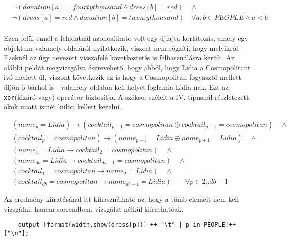 \documentclass[12pt,a4paper,twoside, openright]{report}
\begin{document}
    \begin{equation} \label{eq:16}
    \begin{aligned}
    	&\neg(donation[a]=fourtythousand \wedge dress[b]=red) \quad \wedge \\
    	&\neg(dress[a]=red \wedge donation[b]=twentythousand) \quad \forall a,b \in PEOPLE \wedge a<b \\
    \end{aligned}
    \end{equation}

    Ezen felül ennél a feladatnál azonosítható volt egy újfajta korlátozás, amely egy objektum valamely oldaláról nyilatkozik, viszont nem rögzíti, hogy melyikről.
    Ezeknél az úgy nevezett visszafelé következtetés is felhasználásra került.
    Az alábbi példát megvizsgálva észrevehető, hogy abból, hogy Lidia a Cosmopolitant ivó mellett ül, viszont következik az is hogy a Cosmopolitan fogyasztó mellett – üljön ő bárhol is - valamely oldalon kell helyet foglalnia Lidia-nak.
    Ezt az \texttt{xor}(kizáró vagy) operátor biztosítja.
    A széksor széleit a IV. típusnál részletezett okok miatt ismét külön kellett kezelni.

    \begin{equation}
    \begin{aligned}
     &(name_p=Lidia) \rightarrow (cocktail_{p-1}=cosmopolitan \oplus cocktail_{p+1}=cosmopolitan) \quad \wedge \\
   	 &(cocktail_p=cosmopolitan) \rightarrow (name_{p-1}=Lidia \oplus name_{p+1}=Lidia) \quad \wedge \\
     &(name_1=Lidia \rightarrow cocktail_2=cosmopolitan) \quad \wedge \\
     &(name_{db}=Lidia \rightarrow cocktail_{db-1}=cosmopolitan) \quad \wedge \\
     &(cocktail_1= cosmopolitan \rightarrow name_2=Lidia) \quad \wedge \\
     &(cocktail_{db}=cosmopolitan \rightarrow name_{db-1}=Lidia) \quad \quad \forall p \in 2..db-1
     \end{aligned}
    \end{equation} 
    
    Az eredmény kiíratásánál itt kihasználható az, hogy a tömb elemeit nem kell vizsgálni, hanem sorrendben, vizsgálat nélkül kiírathatóak.
	
	\begin{lstlisting}
	output [format(width,show(dress[p])) ++ "\t" | p in PEOPLE]++["\n"];\end{lstlisting}
\end{document}
